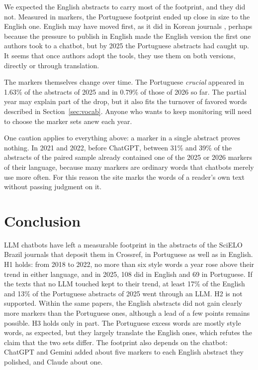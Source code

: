 \documentclass[12pt]{article}
\newcommand{\w}[1]{\textit{#1}}
\begin{document}
We expected the English abstracts to carry most of the footprint, and they did not. Measured in
markers, the Portuguese footprint ended up close in size to the English one. English may have moved
first, as it did in Korean journals \cite{koo2026lexical,lee2026korean}, perhaps because the
pressure to publish in English made the English version the first one authors took to a chatbot,
but by 2025 the Portuguese abstracts had caught up. It seems that once authors adopt the tools,
they use them on both versions, directly or through translation.

The markers themselves change over time. The Portuguese \w{crucial} appeared in 1.63\% of the
abstracts of 2025 and in 0.79\% of those of 2026 so far. The partial year may explain part of the
drop, but it also fits the turnover of favored words described in Section~\ref{sec:vocab}. Anyone
who wants to keep monitoring will need to choose the marker sets anew each year.

One caution applies to everything above: a marker in a single abstract proves nothing. In 2021 and
2022, before ChatGPT, between 31\% and 39\% of the abstracts of the paired sample already contained
one of the 2025 or 2026 markers of their language, because many markers are ordinary words that
chatbots merely use more often. For this reason the site marks the words of a reader's own text
without passing judgment on it.

\section{Conclusion}
\label{sec:conclusion}

LLM chatbots have left a measurable footprint in the abstracts of the SciELO Brazil journals that
deposit them in Crossref, in Portuguese as well as in English. H1 holds: from 2018 to 2022, no more
than six style words a year rose above their trend in either language, and in 2025, 108 did in
English and 69 in Portuguese. If the texts that no LLM touched kept to their trend, at least 17\% of
the English and 13\% of the Portuguese abstracts of 2025 went through an LLM. H2 is not supported.
Within the same papers, the English abstracts did not gain clearly more markers than the Portuguese
ones, although a lead of a few points remains possible. H3 holds only in part. The Portuguese
excess words are mostly style words, as expected, but they largely translate the English ones,
which refutes the claim that the two sets differ. The footprint also depends on the chatbot:
ChatGPT and Gemini added about five markers to each English abstract they polished, and Claude
about one.
\end{document}
